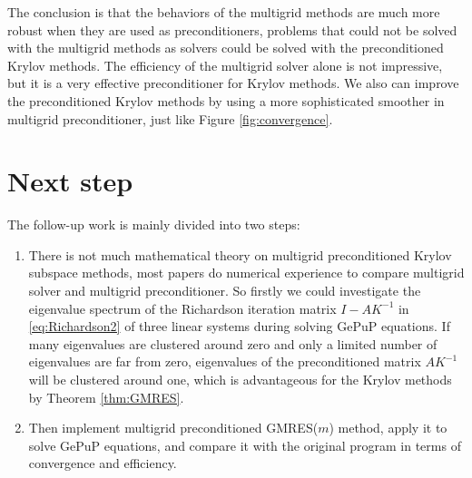 The conclusion is that the behaviors of the multigrid methods
are much more robust when they are used as preconditioners, problems
that could not be solved with the multigrid methods as solvers could
be solved with the preconditioned Krylov methods. The efficiency of
the multigrid solver alone is not impressive, but it is a very
effective preconditioner for Krylov methods. We also can improve the
preconditioned Krylov methods by using a more sophisticated smoother
in multigrid preconditioner, just like Figure \ref{fig:convergence}.

\section{Next step}
\label{sec:goal}

The follow-up work is mainly divided into two steps:

\begin{enumerate}
\item There is not much mathematical theory on multigrid
  preconditioned Krylov subspace methods, most papers do numerical
  experience to compare multigrid solver and multigrid preconditioner.
  So firstly we could investigate the eigenvalue spectrum of the
  Richardson iteration matrix $I-AK^{-1}$ in
  \eqref{eq:Richardson2} of three linear systems during solving GePuP
  equations. If many eigenvalues are clustered around zero and only a
  limited number of eigenvalues are far from zero, eigenvalues of the preconditioned
  matrix $AK^{-1}$  will be clustered around one, which is
  advantageous for the Krylov methods by Theorem \ref{thm:GMRES}.
\item Then implement multigrid preconditioned GMRES($m$) method,
  apply it to solve GePuP equations, and compare it with the original program
  in terms of convergence and efficiency.
\end{enumerate}



